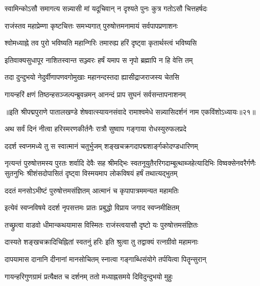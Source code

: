 \twolineshloka
{स्वामिन्कोऽसौ समागत्य सन्न्यासी मां यदूचिवान्}
{न दृश्यते पुनः कुत्र गतोऽसौ चित्तहर्षदः}%


\twolineshloka
{राजंस्तव महाप्रेम्णा कृष्टचित्तः समभ्यगात्}
{पुरुषोत्तमनामायं सर्वपापप्रणाशनः}%

\twolineshloka
{श्वोमध्याह्ने तव पुरो भविष्यति महान्गिरिः}
{तमारुह्य हरिं दृष्ट्वा कृतार्थस्त्वं भविष्यसि}%

\twolineshloka
{इतिवाक्यसुधापूर नाशितस्वान्त सञ्ज्वरः}
{हर्षं यमाप स नृपो ब्रह्मापि न हि वेत्ति तम्}%

\twolineshloka
{तदा दुन्दुभयो नेदुर्वीणापणवगोमुखाः}
{महानन्दस्तदा ह्यासीद्राजराजस्य चेतसि}%

\twolineshloka
{गायन्हरिं क्षणं तिष्ठन्हसञ्जल्पन्ब्रुवन्नमन्}
{आनन्दं प्राप सुघनं सर्वसन्तापनाशनम्}%

{॥इति श्रीपद्मपुराणे पातालखण्डे शेषवात्स्यायनसंवादे रामाश्वमेधे सन्न्यासिदर्शनं नाम एकविंशोऽध्यायः॥२१॥}

\resetShloka


\twolineshloka
{अथ सर्वं दिनं नीत्वा हरिस्मरणकीर्तनैः}
{रात्रौ सुष्वाप गङ्गाया रोधस्युरुफलप्रदे}%

\twolineshloka
{ददर्श स्वप्नमध्ये तु स स्वात्मानं चतुर्भुजम्}
{शङ्खचक्रगदापद्मशार्ङ्गकोदण्डधारिणम्}%

\fourlineindentedshloka
{नृत्यन्तं पुरुषोत्तमस्य पुरतः शर्वादि देवैः सह}
{श्रीमद्भिः स्वतनूयुतैररिगदाम्बूत्थाब्जहेत्यादिभिः}
{विष्वक्सेनवरैर्गणैः सुतनुभिः श्रीशंसदोपासितं}
{दृष्ट्वा विस्मयमाप लोकविषयं हर्षं तथात्यद्भुतम्}%

\twolineshloka
{ददतं मनसोऽभीष्टं पुरुषोत्तमसंज्ञितम्}
{आत्मानं च कृपापात्रममन्यत महामतिः}%

\twolineshloka
{इत्येवं स्वप्नविषये ददर्श नृपसत्तमः}
{प्रातः प्रबुद्धो विप्राय जगाद स्वप्नमीक्षितम्}%

\twolineshloka
{तच्छ्रुत्वा वाडवो धीमान्कथयामास विस्मितः}
{राजंस्त्वयासौ दृष्टो यः पुरुषोत्तमसंज्ञितः}%

\twolineshloka
{दास्यते शङ्खचक्रादिचिह्नितां स्वतनुं हरिः}
{इति श्रुत्वा तु तद्वाक्यं रत्नग्रीवो महामनाः}%

\twolineshloka
{दापयामास दानानि दीनानां मानसोचितम्}
{स्नात्वा गङ्गाब्धिसंयोगे तर्पयित्वा पितॄन्सुरान्}%

\twolineshloka
{गायन्हरिगुणग्रामं प्रत्यैक्षत च दर्शनम्}
{ततो मध्याह्नसमये दिविदुन्दुभयो मुहुः}%

